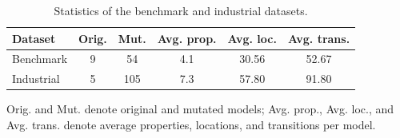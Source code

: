 \begin{table}[t]
\caption{Statistics of the benchmark and industrial datasets.}
\label{tab:dataset-statistics}
\centering
\scriptsize
\setlength{\tabcolsep}{2pt}
\begin{tabular*}{\linewidth}{@{\extracolsep{\fill}}lccccc@{}}
\toprule
Dataset & Orig. & Mut. & Avg. prop. &
Avg. loc. & Avg. trans. \\
\midrule
Benchmark & 9 & 54 & 4.1 & 30.56 & 52.67 \\
Industrial & 5 & 105 & 7.3 & 57.80 & 91.80 \\
\bottomrule
\end{tabular*}
\vspace{1pt}

\footnotesize Orig. and Mut. denote original and mutated models;
Avg. prop., Avg. loc., and Avg. trans. denote average properties,
locations, and transitions per model.
\end{table}

